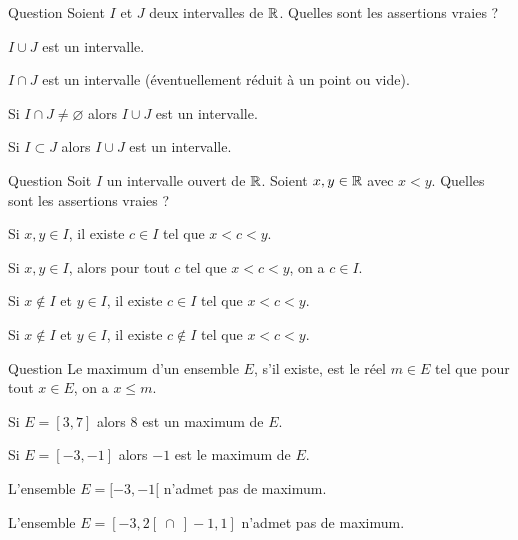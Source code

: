 \begin{multi}[multiple,feedback=
{Tracer les intervalles sur la droite réelle pour mieux comprendre.
Une union d'intervalles n'est en général pas un intervalle !
}]{Question}
Soient \(I\) et \(J\) deux intervalles de \(\mathbb{R}\). Quelles sont les assertions vraies ?

    \item \(I \cup J\) est un intervalle.
    \item* \(I \cap J\) est un intervalle (éventuellement réduit à un point ou vide).
    \item* Si \(I \cap J \neq \varnothing\) alors \(I \cup J\) est un intervalle.
    \item* Si \(I \subset J\) alors \(I \cup J\) est un intervalle.
\end{multi}


\begin{multi}[multiple,feedback=
{Si \(x\) et \(y\) sont deux éléments de l'intervalle \(I\) alors toute valeur entre \(x\) et \(y\) est aussi dans l'intervalle.
}]{Question}
Soit \(I\) un intervalle ouvert de \(\mathbb{R}\). Soient \(x,y \in\mathbb{R}\) avec \(x < y\).
Quelles sont les assertions vraies ?

    \item* Si \(x,y\in I\), il existe \(c\in I\) tel que \(x < c < y\).
    \item* Si \(x,y\in I\), alors pour tout \(c\) tel que \(x < c < y\), on a \(c \in I\).
    \item* Si \(x \notin I\) et \(y\in I\), il existe \(c\in I\) tel que \(x < c < y\).
    \item Si \(x \notin I\) et \(y\in I\), il existe \(c\notin I\) tel que \(x < c < y\).
\end{multi}


\begin{multi}[multiple,feedback=
{Attention, le maximum de \(E\) doit être un élément de \(E\) !
}]{Question}
Le maximum d'un ensemble \(E\), s'il existe, est le réel \(m \in E\) tel que pour tout \(x\in E\), on a \(x \le m\).

    \item Si \(E = [3,7]\) alors \(8\) est un maximum de \(E\).
    \item* Si \(E = [-3,-1]\) alors \(-1\) est le maximum de \(E\).
    \item* L'ensemble \(E = [-3,-1[\) n'admet pas de maximum.
    \item L'ensemble \(E = [-3,2[ \  \cap \  ]-1,1]\) n'admet pas de maximum.
\end{multi}



